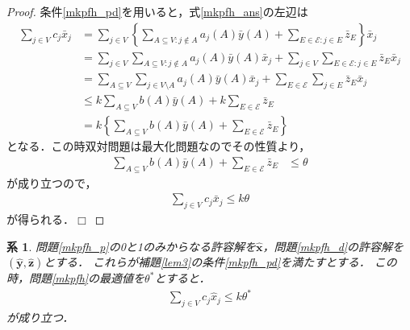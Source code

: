 \documentclass[11pt,dvipdfmx]{jarticle}
\def\qed{\hfill $\Box$}
\numberwithin{equation}{section}
\newtheorem{proof}{証明}
\newtheorem{coro}{系}[section]
\begin{document}
        \begin{proof}
            条件\eqref{mkpfh_pd}を用いると，式\eqref{mkpfh_ans}の左辺は
            \begin{align}
                \sum_{j\in V}{c_j\bar{x}_j} &= \sum_{j\in V}{\left\{\sum_{A\subseteq V:j\notin A}{a_j(A)\bar{y}(A)}+\sum_{E\in \mathcal{E}: j\in E}{\bar{z}_E}\right\}\bar{x}_j}\\
                                      &= \sum_{j\in V}{\sum_{A\subseteq V:j\notin A}{a_j(A)\bar{y}(A)\bar{x}_j}}+\sum_{j\in V}{\sum_{E\in \mathcal{E}: j\in E}{\bar{z}_E\bar{x}_j}}\\
                                      &= \sum_{A\subseteq V}{\sum_{j\in V\setminus A}{a_j(A)\bar{y}(A)\bar{x}_j}}+\sum_{E\in\mathcal{E}}{\sum_{j\in E}{\bar{z}_E\bar{x}_j}}\\
                                      &\le k\sum_{A\subseteq V}{b(A)\bar{y}(A)}+k\sum_{E\in\mathcal{E}}{\bar{z}_E}\\
                                      &= k\left\{\sum_{A\subseteq V}{b(A)\bar{y}(A)}+\sum_{E\in\mathcal{E}}{\bar{z}_E}\right\}
            \end{align}
            となる．この時双対問題は最大化問題なのでその性質より，
            \begin{align}
                \sum_{A\subseteq V}{b(A)\bar{y}(A)}+\sum_{E\in\mathcal{E}}{\bar{z}_E} &\le \theta
            \end{align}
            が成り立つので，
            \begin{align}
                \sum_{j\in V}{c_j\bar{x}_j}\le k\theta
            \end{align}
            が得られる．\qed
        \end{proof}
        \begin{coro}
            問題\eqref{mkpfh_p}の\rm0と1のみからなる許容解を$\hat{\bm{x}}$，問題\eqref{mkpfh_d}の許容解を$(\hat{\bm{y}},\hat{\bm{z}})$とする．
            これらが補題\ref{lem3}の条件\eqref{mkpfh_pd}を満たすとする．
            この時，問題\eqref{mkpfh}の最適値を$\theta^*$とすると．
            \begin{align}
                \sum_{j\in V}{c_j\hat{x}_j}\le k\theta^*
            \end{align}
            が成り立つ．
            \label{coro2}
        \end{coro}
\end{document}
